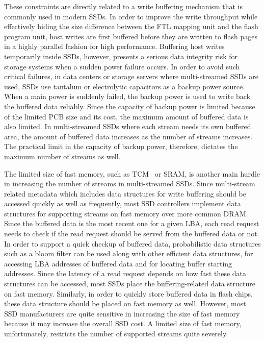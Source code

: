 These constraints are directly related to a write buffering mechanism that is
commonly used in modern SSDs.   In order to improve the write throughput while
effectively hiding the size difference between the FTL mapping unit and the
flash program unit, host writes are first buffered before they are written to
flash pages in a highly parallel fashion for high performance.  Buffering host
writes temporarily inside SSDs, however, presents a serious data integrity risk
for storage systems when a sudden power failure occurs.  In order to avoid such
critical failures, in data centers or storage servers where multi-streamed SSDs
are used, SSDs use tantalum or electrolytic capacitors as a backup power
source.  When a main power is suddenly failed, the backup power is used to
write back the buffered data reliably.  Since the capacity of backup power is
limited because of the limited PCB size and its cost, the maximum amount of
buffered data is also limited.  In multi-streamed SSDs where each stream needs
its own buffered area, the amount of buffered data increases as the number of
streams increases.  The practical limit in the capacity of backup power,
therefore, dictates the maximum number of streams as well.

The limited size of fast memory, such as TCM~\cite{TCM} or SRAM, is another
main hurdle in increasing the number of streams in multi-streamed SSDs.  Since
multi-stream related metadata which includes data structures for write
buffering should be accessed quickly as well as frequently, most SSD
controllers implement data structures for supporting streams on fast memory
over more common DRAM.  Since the buffered data is the most recent one for a
given LBA, each read request needs to check if the read request should be
served from the buffered data or not.  In order to support a quick checkup of
buffered data, probabilistic data structures such as a bloom filter can be used
along with other efficient data structures, for accessing LBA addresses of
buffered data and for locating buffer starting addresses.   Since the latency
of a read request depends on how fast these data structures can be accessed,
most SSDs place the buffering-related data structure on fast memory.
Similarly, in order to quickly store buffered data in flash chips, these data
structure should be placed on fast memory as well.  However, most SSD
manufacturers are quite sensitive in increasing the size of fast memory because
it may increase the overall SSD cost.   A limited size of fast memory,
unfortunately, restricts the number of supported streams quite severely.

